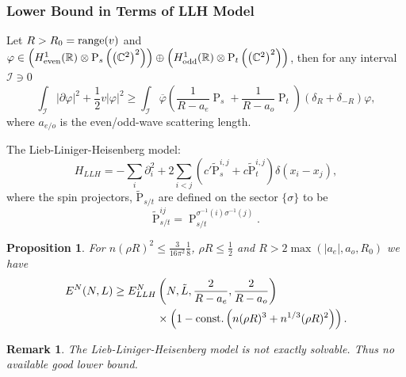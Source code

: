 \documentclass{beamer}[10]
\newcommand{\abs}[1]{\left\lvert #1 \right\rvert}
\newcommand{\R}{\mathbb{R}}
\newcommand{\C}{\mathbb{C}}
\newtheorem{mproposition}{Proposition}
\newtheorem{mremark}{Remark}
\begin{document}
\begin{frame}
	\frametitle{Lower Bound in Terms of LLH Model}
	\small
	\begin{lemma}
		\label{LemmaDysonSpin1/2Fermi}
		Let $ R>R_0=\textnormal{range}(v) $ and $ \varphi\in \left(H_{\textnormal{even}}^1(\R)\otimes\operatorname{P}_s \left(\left(\C^2\right)^2\right)\right)\oplus\left(H_{\textnormal{odd}}^1(\R)\otimes \operatorname{P}_t \left(\left(\C^2\right)^2\right) \right) $, then for any interval $ \mathcal{I}\ni 0 $ 
		\begin{equation}
			\int_{\mathcal{I}} \abs{\partial \varphi}^2+\frac12 v\abs{\varphi}^2\geq \int_{\mathcal{I}}\overline{\varphi}\left(\frac{1}{R-a_e}\operatorname{P}_s+\frac{1}{R-a_o}\operatorname{P}_t\right)\left(\delta_R+\delta_{-R}\right)\varphi,
		\end{equation}
		where $ a_{e/o} $ is the even/odd-wave scattering length.
	\end{lemma}
The Lieb-Liniger-Heisenberg model: \begin{equation}\label{EqHamiltonianLLH}
	H_{LLH}=-\sum_i \partial_i^2 +2\sum_{i<j} \left(c'\operatorname{\tilde{P}}^{i,j}_s+c\operatorname{\tilde{P}}^{i,j}_t\right)\delta(x_i-x_j),
\end{equation}
where the spin projectors, $\operatorname{\tilde{P}}_{s/t}$ are defined on the sector $ \{\sigma\} $ to be  $$\operatorname{\tilde{P}}^{ij}_{s/t}=\operatorname{P}^{\sigma^{-1}(i)\sigma^{-1}(j)}_{s/t}.$$
\end{frame}
\begin{frame}
\begin{mproposition}
	\label{PropositionLowerBoundSpecNSpin1/2Fermi}
	For $ n(\rho R)^2\leq  \frac{3}{16\pi^2}\frac{1}{8} $, $ \rho R\leq \frac{1}{2} $ and $ R>2\max(\abs{a_e},a_o,R_0) $ we have \begin{equation}
		\begin{aligned}
			E^N(N,L)\geq E_{LLH}^N&\left(N,\tilde{L},\frac{2}{R-a_e},\frac{2}{R-a_o}\right)\\&\times\left(1-\textnormal{const.}\left(n(\rho R)^3+n^{1/3}(\rho R)^2\right)\right).
		\end{aligned}
	\end{equation}
\end{mproposition}
\begin{mremark}
	The Lieb-Liniger-Heisenberg model is not exactly solvable. Thus no available good lower bound.
\end{mremark}
\end{frame}
\end{document}
